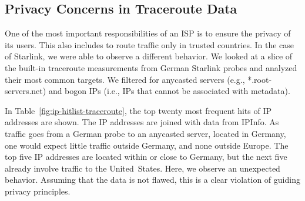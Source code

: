 \subsection{Privacy Concerns in Traceroute Data}

One of the most important responsibilities of an \ac{ISP} is to ensure the privacy of its users. This also includes to route traffic only in trusted countries. In the case of Starlink, we were able to observe a different behavior. We looked at a slice of the built-in traceroute measurements from German Starlink probes and analyzed their most common targets. We filtered for anycasted servers (e.g., *.root-servers.net) and bogon IPs (i.e., IPs that cannot be associated with metadata).



In Table~\ref{fig:ip-hitlist-traceroute}, the top twenty most frequent hits of IP addresses are shown. The IP addresses are joined with data from IPInfo. As traffic goes from a German probe to an anycasted server, located in Germany, one would expect little traffic outside Germany, and none outside Europe. The top five IP addresses are located within or close to Germany, but the next five already involve traffic to the United~States. Here, we observe an unexpected behavior. Assuming that the data is not flawed, this is a clear violation of guiding privacy principles.

